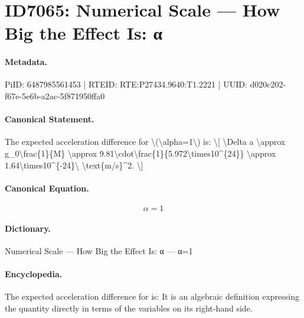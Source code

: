 \section*{ID7065: Numerical Scale — How Big the Effect Is: α}
\paragraph{Metadata.}
PiID: 6487985561453 | RTEID: RTE:P27434.9640:T1.2221 | UUID: d020c202-f67e-5e6b-a2ac-5f871950ffa0

\paragraph{Canonical Statement.}
The expected acceleration difference for \textbackslash{}(\textbackslash{}alpha=1\textbackslash{}) is: \textbackslash{}[ \textbackslash{}Delta a \textbackslash{}approx g\_0\textbackslash{}frac\{1\}\{M\} \textbackslash{}approx 9.81\textbackslash{}cdot\textbackslash{}frac\{1\}\{5.972\textbackslash{}times10\textasciicircum{}\{24\}\} \textbackslash{}approx 1.64\textbackslash{}times10\textasciicircum{}\{-24\}\textbackslash{} \textbackslash{}text\{m/s\}\textasciicircum{}2. \textbackslash{}]

\paragraph{Canonical Equation.}
\[
\alpha=1
\]

\paragraph{Dictionary.}
Numerical Scale — How Big the Effect Is: α — α=1

\paragraph{Encyclopedia.}
The expected acceleration difference for is: It is an algebraic definition expressing the quantity directly in terms of the variables on its right-hand side.
